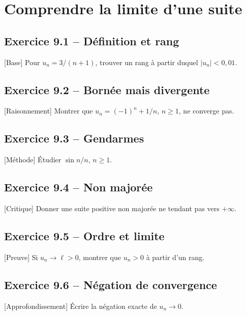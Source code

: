 \chapter{Comprendre la limite d’une suite}
\section*{Exercice 9.1 -- Définition et rang}
[Base] Pour $u_n=3/(n+1)$, trouver un rang à partir duquel $|u_n|<0{,}01$.

\section*{Exercice 9.2 -- Bornée mais divergente}
[Raisonnement] Montrer que $u_n=(-1)^n+1/n$, $n\ge1$, ne converge pas.

\section*{Exercice 9.3 -- Gendarmes}
[Méthode] Étudier $\sin n/n$, $n\ge1$.

\section*{Exercice 9.4 -- Non majorée}
[Critique] Donner une suite positive non majorée ne tendant pas vers $+\infty$.

\section*{Exercice 9.5 -- Ordre et limite}
[Preuve] Si $u_n\to\ell>0$, montrer que $u_n>0$ à partir d'un rang.

\section*{Exercice 9.6 -- Négation de convergence}
[Approfondissement] Écrire la négation exacte de $u_n\to0$.
